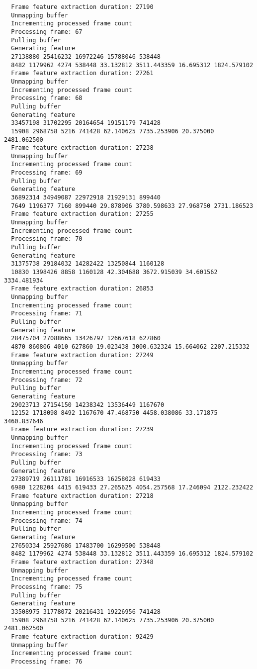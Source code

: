 \documentclass[12pt,oneside]{book}
\begin{document}
\begin{lstlisting}
  Frame feature extraction duration: 27190
  Unmapping buffer
  Incrementing processed frame count
  Processing frame: 67
  Pulling buffer
  Generating feature
  27138880 25416232 16972246 15788046 538448
  8482 1179962 4274 538448 33.132812 3511.443359 16.695312 1824.579102
  Frame feature extraction duration: 27261
  Unmapping buffer
  Incrementing processed frame count
  Processing frame: 68
  Pulling buffer
  Generating feature
  33457198 31702295 20164654 19151179 741428
  15908 2968758 5216 741428 62.140625 7735.253906 20.375000 2481.062500
  Frame feature extraction duration: 27238
  Unmapping buffer
  Incrementing processed frame count
  Processing frame: 69
  Pulling buffer
  Generating feature
  36892314 34949087 22972918 21929131 899440
  7649 1196377 7160 899440 29.878906 3780.598633 27.968750 2731.186523
  Frame feature extraction duration: 27255
  Unmapping buffer
  Incrementing processed frame count
  Processing frame: 70
  Pulling buffer
  Generating feature
  31375738 29184032 14282422 13250844 1160128
  10830 1398426 8858 1160128 42.304688 3672.915039 34.601562 3334.481934
  Frame feature extraction duration: 26853
  Unmapping buffer
  Incrementing processed frame count
  Processing frame: 71
  Pulling buffer
  Generating feature
  28475704 27088665 13426797 12667618 627860
  4870 860806 4010 627860 19.023438 3000.632324 15.664062 2207.215332
  Frame feature extraction duration: 27249
  Unmapping buffer
  Incrementing processed frame count
  Processing frame: 72
  Pulling buffer
  Generating feature
  29023713 27154150 14238342 13536449 1167670
  12152 1718098 8492 1167670 47.468750 4458.038086 33.171875 3460.837646
  Frame feature extraction duration: 27239
  Unmapping buffer
  Incrementing processed frame count
  Processing frame: 73
  Pulling buffer
  Generating feature
  27389719 26111781 16916533 16258028 619433
  6980 1228204 4415 619433 27.265625 4054.257568 17.246094 2122.232422
  Frame feature extraction duration: 27218
  Unmapping buffer
  Incrementing processed frame count
  Processing frame: 74
  Pulling buffer
  Generating feature
  27650334 25927686 17483700 16299500 538448
  8482 1179962 4274 538448 33.132812 3511.443359 16.695312 1824.579102
  Frame feature extraction duration: 27348
  Unmapping buffer
  Incrementing processed frame count
  Processing frame: 75
  Pulling buffer
  Generating feature
  33508975 31778072 20216431 19226956 741428
  15908 2968758 5216 741428 62.140625 7735.253906 20.375000 2481.062500
  Frame feature extraction duration: 92429
  Unmapping buffer
  Incrementing processed frame count
  Processing frame: 76

\end{lstlisting}
\end{document}
